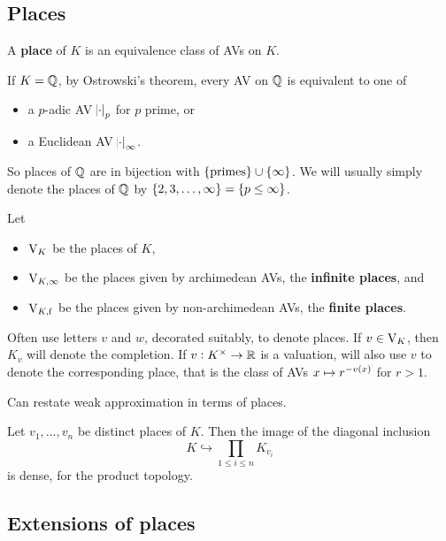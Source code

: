 \subsection{Places}

\begin{definition*}
A \textbf{place} of $ K $ is an equivalence class of AVs on $ K $.
\end{definition*}

\begin{example*}
If $ K = \mathbb{Q} $, by Ostrowski's theorem, every AV on $ \mathbb{Q} $ is equivalent to one of
\begin{itemize}
\item a $ p $-adic AV $ \abs{\cdot}_p $ for $ p $ prime, or
\item a Euclidean AV $ \abs{\cdot}_\infty $.
\end{itemize}
So places of $ \mathbb{Q} $ are in bijection with $ \cbr{\text{primes}} \cup \cbr{\infty} $. We will usually simply denote the places of $ \mathbb{Q} $ by $ \cbr{2, 3, \dots, \infty} = \cbr{p \le \infty} $.
\end{example*}

\begin{notation*}
Let
\begin{itemize}
\item $ \mathrm{V}_K $ be the places of $ K $,
\item $ \mathrm{V}_{K, \infty} $ be the places given by archimedean AVs, the \textbf{infinite places}, and
\item $ \mathrm{V}_{K, \mathrm{f}} $ be the places given by non-archimedean AVs, the \textbf{finite places}.
\end{itemize}
Often use letters $ v $ and $ w $, decorated suitably, to denote places. If $ v \in \mathrm{V}_K $, then $ K_v $ will denote the completion. If $ v : K^\times \to \mathbb{R} $ is a valuation, will also use $ v $ to denote the corresponding place, that is the class of AVs $ x \mapsto r^{-v\br{x}} $ for $ r > 1 $.
\end{notation*}

Can restate weak approximation in terms of places.

\begin{proposition}
Let $ v_1, \dots, v_n $ be distinct places of $ K $. Then the image of the diagonal inclusion
$$ K \hookrightarrow \prod_{1 \le i \le n} K_{v_i} $$
is dense, for the product topology.
\end{proposition}

\pagebreak

\subsection{Extensions of places}

